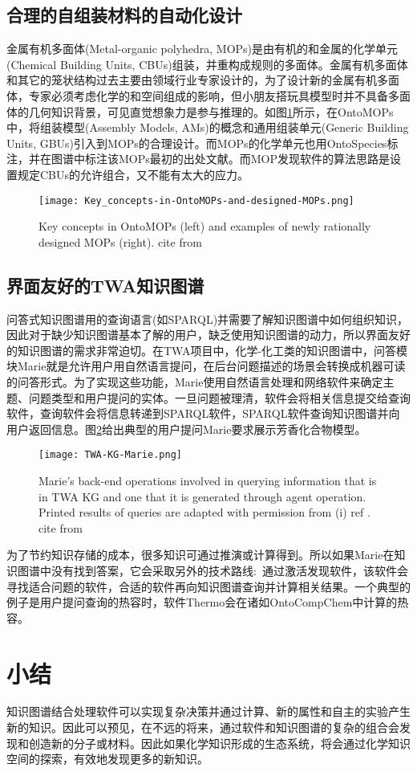 \subsection{合理的自组装材料的自动化设计}
金属有机多面体\textrm{(Metal-organic polyhedra, MOPs)}是由有机的和金属的化学单元\textrm{(Chemical Building Units, CBUs)}组装，并重构成规则的多面体。金属有机多面体和其它的笼状结构过去主要由领域行业专家设计的，为了设计新的金属有机多面体，专家必须考虑化学的和空间组成的影响，但小朋友搭玩具模型时并不具备多面体的几何知识背景，可见直觉想象力是参与推理的。如图\ref{Fig:OntoMOPs-MOPs}所示，在\textrm{OntoMOPs}中，将组装模型\textrm{(Assembly Models, AMs)}的概念和通用组装单元\textrm{(Generic Building Units, GBUs)}引入到\textrm{MOPs}的合理设计。而\textrm{MOPs}的化学单元也用\textrm{OntoSpecies}标注，并在图谱中标注该\textrm{MOPs}最初的出处文献。而\textrm{MOP}发现软件的算法思路是设置规定\textrm{CBUs}的允许组合，又不能有太大的应力。
\begin{figure}[h!]
\centering
\texttt{[image: Key\_concepts-in-OntoMOPs-and-designed-MOPs.png]}
\caption{\small\textrm{Key concepts in OntoMOPs (left) and examples of newly rationally designed MOPs (right). cite from\cite{ACR56-128_2023}}}%
\label{Fig:OntoMOPs-MOPs}
\end{figure}
\subsection{界面友好的\rm{TWA}知识图谱}
问答式知识图谱用的查询语言(如\textrm{SPARQL})并需要了解知识图谱中如何组织知识，因此对于缺少知识图谱基本了解的用户，缺乏使用知识图谱的动力，所以界面友好的知识图谱的需求非常迫切。在\textrm{TWA}项目中，化学-化工类的知识图谱中，问答模块\textrm{Marie}就是允许用户用自然语言提问，在后台问题描述的场景会转换成机器可读的问答形式。为了实现这些功能，\textrm{Marie}使用自然语言处理和网络软件来确定主题、问题类型和用户提问的实体。一旦问题被理清，软件会将相关信息提交给查询软件，查询软件会将信息转递到\textrm{SPARQL}软件，\textrm{SPARQL}软件查询知识图谱并向用户返回信息。图\ref{Fig:TWA-KG-Marie}给出典型的用户提问\textrm{Marie}要求展示芳香化合物模型。
\begin{figure}[h!]
\centering
\texttt{[image: TWA-KG-Marie.png]}
\caption{\small\textrm{Marie's back-end operations involved in querying information that is in TWA KG and one that it is generated through agent operation. Printed results of queries are adapted with permission from (i) ref \cite{JCIM61-3868_2021}. cite from\cite{ACR56-128_2023}}}%
\label{Fig:TWA-KG-Marie}
\end{figure}
为了节约知识存储的成本，很多知识可通过推演或计算得到。所以如果\textrm{Marie}在知识图谱中没有找到答案，它会采取另外的技术路线:~通过激活发现软件，该软件会寻找适合问题的软件，合适的软件再向知识图谱查询并计算相关结果。一个典型的例子是用户提问查询的热容时，软件\textrm{Thermo}会在诸如\textrm{OntoCompChem}中计算的热容。
\section{小结}
知识图谱结合处理软件可以实现复杂决策并通过计算、新的属性和自主的实验产生新的知识。因此可以预见，在不远的将来，通过软件和知识图谱的复杂的组合会发现和创造新的分子或材料。因此如果化学知识形成的生态系统，将会通过化学知识空间的探索，有效地发现更多的新知识。
